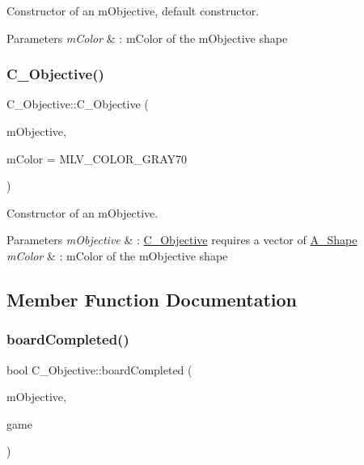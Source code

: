 Constructor of an mObjective, default constructor.


\begin{DoxyParams}{Parameters}
{\em mColor} & \+: mColor of the mObjective shape \\
\hline
\end{DoxyParams}
\mbox{\label{classObjective_a7b72b9e9f9174ec9ee98e3a0a28773f2}} 
\subsubsection{\texorpdfstring{C_Objective()}{C_Objective()}\hspace{0.1cm}{\footnotesize\ttfamily [2/2]}}
{\footnotesize\ttfamily C_Objective\+::\+C_Objective (\begin{DoxyParamCaption}\item[{const std\+::vector$<$ std\+::shared\+\_\+ptr$<$ \hyperlink{classShape}{A_Shape} $>$$>$ \&}]{mObjective,  }\item[{M\+L\+V\+\_\+\+Color}]{mColor = {\ttfamily MLV\+\_\+COLOR\+\_\+GRAY70} }\end{DoxyParamCaption})\hspace{0.3cm}{\ttfamily [explicit]}}



Constructor of an mObjective.


\begin{DoxyParams}{Parameters}
{\em mObjective} & \+: \hyperlink{classObjective}{C_Objective} requires a vector of \hyperlink{classShape}{A_Shape} \\
\hline
{\em mColor} & \+: mColor of the mObjective shape \\
\hline
\end{DoxyParams}


\subsection{Member Function Documentation}
\mbox{\label{classObjective_aba5fe938ebccb3825d6b03cd789d6d61}} 
\subsubsection{\texorpdfstring{board\+Completed()}{BoardCompleted()}}
{\footnotesize\ttfamily bool C_Objective\+::board\+Completed (\begin{DoxyParamCaption}\item[{const std\+::vector$<$ std\+::shared\+\_\+ptr$<$ \hyperlink{classShape}{A_Shape} $>$$>$ \&}]{mObjective,  }\item[{const std\+::vector$<$ std\+::shared\+\_\+ptr$<$ \hyperlink{classShape}{A_Shape} $>$$>$ \&}]{game }\end{DoxyParamCaption})\hspace{0.3cm}{\ttfamily [static]}}



